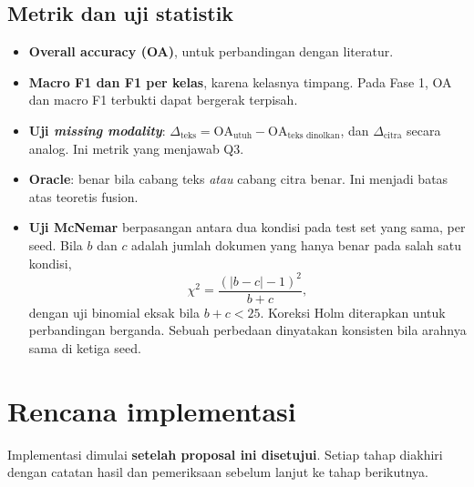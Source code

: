 \documentclass[11pt,a4paper]{article}
\begin{document}
\subsection{Metrik dan uji statistik}

\begin{itemize}
  \item \textbf{Overall accuracy (OA)}, untuk perbandingan dengan literatur.
  \item \textbf{Macro F1 dan F1 per kelas}, karena kelasnya timpang. Pada Fase 1, OA dan
  macro F1 terbukti dapat bergerak terpisah.
  \item \textbf{Uji \textit{missing modality}}:
  $\Delta_\text{teks} = \text{OA}_\text{utuh} - \text{OA}_\text{teks dinolkan}$, dan
  $\Delta_\text{citra}$ secara analog. Ini metrik yang menjawab Q3.
  \item \textbf{Oracle}: benar bila cabang teks \emph{atau} cabang citra benar. Ini
  menjadi batas atas teoretis fusion.
  \item \textbf{Uji McNemar} berpasangan antara dua kondisi pada test set yang sama, per
  seed. Bila $b$ dan $c$ adalah jumlah dokumen yang hanya benar pada salah satu kondisi,
  \[
  \chi^2 = \frac{(|b - c| - 1)^2}{b + c},
  \]
  dengan uji binomial eksak bila $b + c < 25$. Koreksi Holm diterapkan untuk
  perbandingan berganda. Sebuah perbedaan dinyatakan konsisten bila arahnya sama di
  ketiga seed.
\end{itemize}

\section{Rencana implementasi}

Implementasi dimulai \textbf{setelah proposal ini disetujui}. Setiap tahap diakhiri
dengan catatan hasil dan pemeriksaan sebelum lanjut ke tahap berikutnya.
\end{document}
